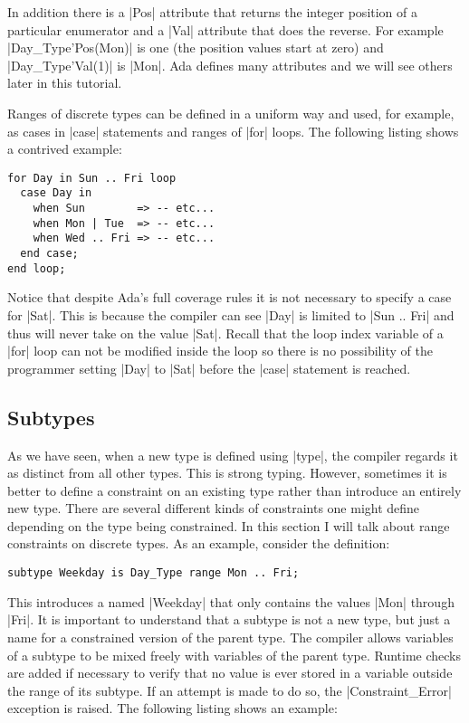 In addition there is a |Pos| attribute that returns the integer position of a particular
enumerator and a |Val| attribute that does the reverse. For example |Day_Type'Pos(Mon)| is one
(the position values start at zero) and |Day_Type'Val(1)| is |Mon|. Ada defines many attributes
and we will see others later in this tutorial.

Ranges of discrete types can be defined in a uniform way and used, for example, as cases in
|case| statements and ranges of |for| loops. The following listing shows a contrived example:

\begin{lstlisting}
for Day in Sun .. Fri loop
  case Day in
    when Sun        => -- etc...
    when Mon | Tue  => -- etc...
    when Wed .. Fri => -- etc...
  end case;
end loop;
\end{lstlisting}

\noindent Notice that despite Ada's full coverage rules it is not necessary to specify a case
for |Sat|. This is because the compiler can see |Day| is limited to |Sun .. Fri| and thus will
never take on the value |Sat|. Recall that the loop index variable of a |for| loop can not be
modified inside the loop so there is no possibility of the programmer setting |Day| to |Sat|
before the |case| statement is reached.

\subsection{Subtypes}

As we have seen, when a new type is defined using |type|, the compiler regards it as distinct
from all other types. This is strong typing. However, sometimes it is better to define a
constraint on an existing type rather than introduce an entirely new type. There are several
different kinds of constraints one might define depending on the type being constrained. In this
section I will talk about range constraints on discrete types. As an example, consider the
definition:

\begin{lstlisting}
subtype Weekday is Day_Type range Mon .. Fri;
\end{lstlisting}

\noindent This introduces a  named |Weekday| that only contains the values
|Mon| through |Fri|. It is important to understand that a subtype is not a new type, but just a
name for a constrained version of the parent type. The compiler allows variables of a subtype to
be mixed freely with variables of the parent type. Runtime checks are added if necessary to
verify that no value is ever stored in a variable outside the range of its subtype. If an
attempt is made to do so, the |Constraint_Error| exception is raised. The following listing
shows an example:

